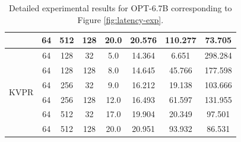 \documentclass[11pt]{article}
\newcommand{\paperName}{KVPR}
\begin{document}
\begin{table}[h]
{\begin{tabular}{cccccccc}
 & 64 & 512 & 128 & 20.0 & 20.576 & 110.277 & 73.705 \\ \hline
\multirow{6}{*}{{\paperName}} & 64 & 128 & 32 & 5.0 & 14.364 & 6.651 & 298.284 \\ \cline{2-8} 
 & 64 & 128 & 128 & 8.0 & 14.645 & 45.766 & 177.598 \\ \cline{2-8} 
 & 64 & 256 & 32 & 9.0 & 16.212 & 19.138 & 103.666 \\ \cline{2-8} 
 & 64 & 256 & 128 & 12.0 & 16.493 & 61.597 & 131.955 \\ \cline{2-8} 
 & 64 & 512 & 32 & 17.0 & 19.904 & 20.349 & 97.501 \\ \cline{2-8} 
 & 64 & 512 & 128 & 20.0 & 20.951 & 93.932 & 86.531 \\ \hline
\end{tabular}
}
\caption{Detailed experimental results for OPT-6.7B corresponding to Figure \ref{fig:latency-exp}.}
\label{app:tab:opt-6.7b}
\end{table}
\end{document}
